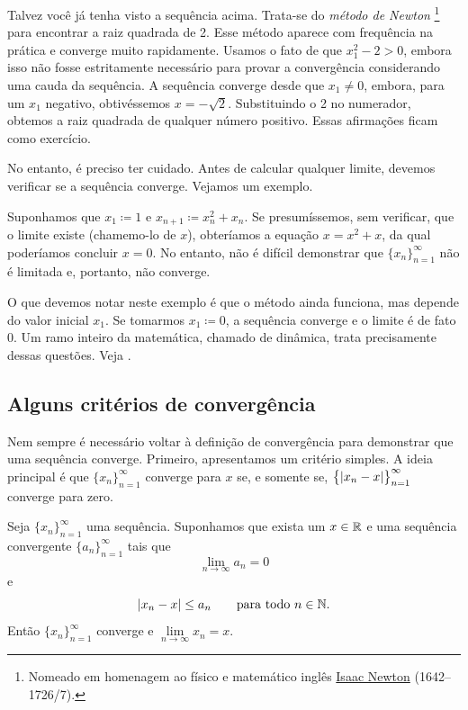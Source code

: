Talvez você já tenha visto a sequência acima. Trata-se do
\emph{método de Newton}%
\footnote{%
Nomeado em homenagem ao físico e matemático inglês
\href{https://en.wikipedia.org/wiki/Isaac_Newton}{Isaac Newton}
(1642--1726/7).}
para encontrar a raiz quadrada de 2. Esse método aparece com frequência na
prática e converge muito rapidamente. Usamos o fato de que
$x_1^2 -2 >0$, embora isso não fosse estritamente necessário para provar a convergência
considerando uma cauda da sequência.
A sequência converge desde que $x_1 \neq 0$, embora, para um $x_1$
negativo, obtivéssemos $x=-\sqrt{2}$. Substituindo o 2 no numerador,
obtemos a raiz quadrada de qualquer número positivo. Essas afirmações ficam como
exercício.

No entanto, é preciso ter cuidado. Antes de calcular qualquer limite, devemos
verificar se a sequência converge. Vejamos um exemplo.

\begin{example}
Suponhamos que $x_1 \coloneqq 1$ e $x_{n+1} \coloneqq x_n^2+x_n$.
Se presumíssemos, sem verificar, que o limite existe (chamemo-lo de $x$), obteríamos
a equação $x = x^2+x$, da qual poderíamos
concluir $x=0$. No entanto, não é difícil
demonstrar que $\{ x_n \}_{n=1}^\infty$ não é limitada e, portanto, não converge.

O que devemos notar neste exemplo é que o método ainda funciona, mas
depende do valor inicial $x_1$. Se tomarmos $x_1 \coloneqq 0$,
a sequência converge e o limite é de fato 0.
Um ramo inteiro da matemática, chamado de dinâmica, trata precisamente dessas
questões.
Veja
.
\end{example}

\subsection{Alguns critérios de convergência}

Nem sempre é necessário voltar à definição de convergência
para demonstrar que uma sequência converge. Primeiro, apresentamos um critério simples.
A ideia principal é que
$\{ x_n \}_{n=1}^\infty$ converge para $x$ se, e somente se,
$\bigl\{ \lvert { x_n - x } \rvert \bigr\}_{n=1}^\infty$ converge para zero.

\begin{prop} \label{convzero:prop}
Seja $\{ x_n \}_{n=1}^\infty$ uma sequência.
Suponhamos que exista um $x \in {\mathbb{R}}$
e uma sequência convergente $\{ a_n \}_{n=1}^\infty$
tais que
\begin{equation*}
\lim_{n\to\infty} a_n = 0
\end{equation*}
e
\begin{equation*}
\lvert {x_n - x} \rvert \leq a_n
\qquad
\text{para todo $n \in {\mathbb{N}}$.}
\end{equation*}
Então $\{ x_n \}_{n=1}^\infty$ converge e $\lim\limits_{n\to\infty} x_n = x$.
\end{prop}

